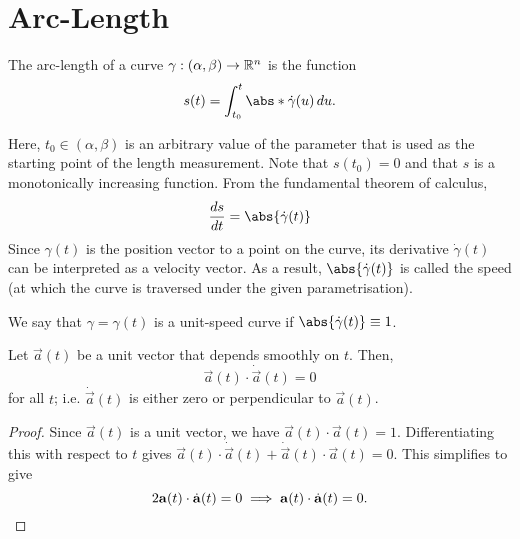 \documentclass[11pt]{penrose}
\newcommand{\keyword}[1]{\textsf{#1}}
\begin{document}
\section{Arc-Length}
\begin{ndfn}
    The \keyword{arc-length} of a curve $\gamma : (\alpha, \beta) \to \R^n$ is the function
    \begin{equation}
        s(t) = \int_{t_0}^{t} \abs*{\dot{\gamma}(u)} \,du.
        \label{eq:arclength-dfn}
    \end{equation}
\end{ndfn}

Here, $t_0 \in (\alpha, \beta)$ is an arbitrary value of the parameter that is used as the starting point of the length measurement. Note that $s(t_0) = 0$ and that $s$ is a monotonically increasing function. From the fundamental theorem of calculus,
\begin{equation}
    \frac{ds}{dt} = \abs{\dot{\gamma}(t)}
    \label{eq:speed-dfn}
\end{equation}
Since $\gamma(t)$ is the \keyword{position} vector to a point on the curve, its derivative $\dot{\gamma}(t)$ can be interpreted as a \keyword{velocity} vector. As a result, $\abs{\dot{\gamma}(t)}$ is called the \keyword{speed} (at which the curve is traversed under the given parametrisation).

\begin{ndfn}
    We say that $\gamma = \gamma(t)$ is a \keyword{unit-speed curve} if $\abs{\dot{\gamma}(t)} \equiv 1$.
\end{ndfn}

\begin{nprop}
    Let $\vec{a}(t)$ be a unit vector that depends smoothly on $t$. Then,
    \begin{equation}
        \vec{a}(t) \cdot \dot{\vec{a}}(t) = 0
    \end{equation}
    for all $t$; i.e. $\dot{\vec{a}}(t)$ is either zero or perpendicular to $\vec{a}(t)$.
\end{nprop}
\begin{proof}
    Since $\vec{a}(t)$ is a unit vector, we have $\vec{a}(t) \cdot \vec{a}(t) = 1$. Differentiating this with respect to $t$ gives $\vec{a}(t) \cdot \dot{\vec{a}}(t) + \dot{\vec{a}}(t) \cdot \vec{a}(t) = 0$. This simplifies to give
    \begin{equation}
        2 \vec{a}(t) \cdot \dot{\vec{a}}(t) = 0
        \implies
        \vec{a}(t) \cdot \dot{\vec{a}}(t) = 0.\qedhere
    \end{equation}
\end{proof}
\end{document}
